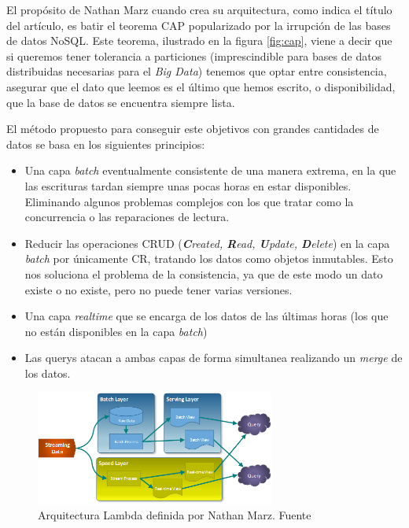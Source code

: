 El propósito de Nathan Marz cuando crea su arquitectura, como indica el título del artículo, es batir el teorema CAP popularizado por la irrupción de las bases de datos NoSQL. Este teorema, ilustrado en la figura \ref{fig:cap}, viene a decir que si queremos tener tolerancia a particiones (imprescindible para bases de datos distribuidas necesarias para el \textit{Big Data}) tenemos que optar entre consistencia, asegurar que el dato que leemos es el último que hemos escrito, o disponibilidad, que la base de datos se encuentra siempre lista.



El método propuesto para conseguir este objetivos con grandes cantidades de datos se basa en los siguientes principios:

\begin{itemize}
	\item Una capa \textit{batch} eventualmente consistente de una manera extrema, en la que las escrituras tardan siempre unas pocas horas en estar disponibles. Eliminando algunos problemas complejos con los que tratar como  la concurrencia o las reparaciones de lectura. 
	\item Reducir las operaciones CRUD (\textit{\textbf{C}reated, \textbf{R}ead, \textbf{U}pdate, \textbf{D}elete}) en la capa \textit{batch} por únicamente CR, tratando los datos como objetos inmutables. Esto nos soluciona el problema de la consistencia, ya que de este modo un dato existe o no existe, pero no puede tener varias versiones. 
	\item Una capa \textit{realtime} que se encarga de los datos de las últimas horas (los que no están disponibles en la capa \textit{batch})
	\item Las querys atacan a ambas capas de forma simultanea realizando un \textit{merge} de los datos.
	
\end{itemize}

\begin{figure}[!ht]
	\centering
	\includegraphics[width=0.70\textwidth]{images/arte/lambda}
	\caption{Arquitectura Lambda definida por   Nathan Marz. Fuente \cite{lambdakappa}}
	\label{fig:lambda}
\end{figure}


